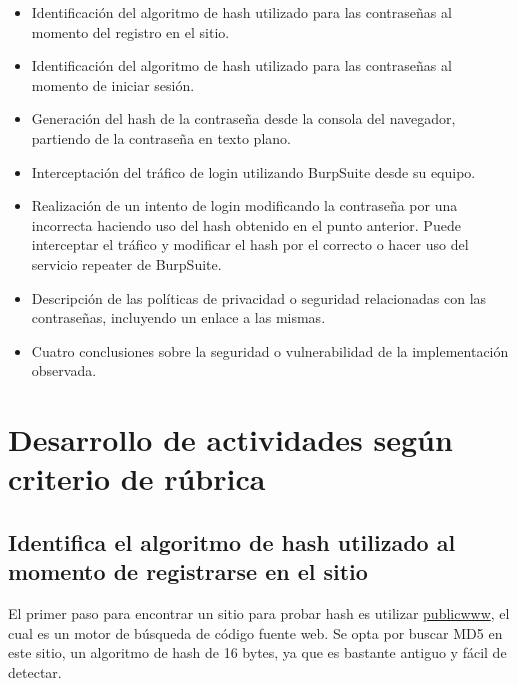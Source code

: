 \documentclass[letter,12pt]{article}
\begin{document}
\begin{itemize}
    \item Identificación del algoritmo de hash utilizado para las contraseñas al momento del registro en el sitio.
    
    \item Identificación del algoritmo de hash utilizado para las contraseñas al momento de iniciar sesión.

    \item Generación del hash de la contraseña desde la consola del navegador, partiendo de la contraseña en texto plano.

    \item Interceptación del tráfico de login utilizando BurpSuite desde su equipo.

    \item Realización de un intento de login modificando la contraseña por una incorrecta haciendo uso del hash obtenido en el punto anterior. Puede interceptar el tráfico y modificar el hash por el correcto o hacer uso del servicio repeater de BurpSuite.

    \item Descripción de las políticas de privacidad o seguridad relacionadas con las contraseñas, incluyendo un enlace a las mismas.

    \item Cuatro conclusiones sobre la seguridad o vulnerabilidad de la implementación observada.
    
\end{itemize}

\section{Desarrollo de actividades según criterio de rúbrica}





\subsection{Identifica el algoritmo de hash utilizado al momento de registrarse en el sitio}
El primer paso para encontrar un sitio para probar hash es utilizar \href{https://publicwww.com/websites/}{publicwww}, el cual es un motor de búsqueda de código fuente web. Se opta por buscar MD5 en este sitio, un algoritmo de hash de 16 bytes, ya que es bastante antiguo y fácil de detectar.
\end{document}
